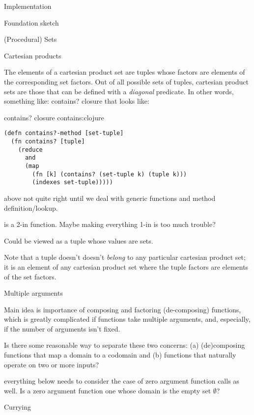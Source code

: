 \documentclass[11pt]{PalisadesLakesBook}
\begin{document}
\begin{plSection}{Implementation}
\begin{plSection}{Foundation sketch}
\begin{plSection}{(Procedural) Sets}
\begin{plSection}{Cartesian products} 

The elements of a cartesian product set are tuples
whose factors are elements of the corresponding set factors.
Out of all possible sets of tuples, cartesian product sets
are those that can be defined with a \emph{diagonal} predicate.
In other words, something like:
{\pseudocodeFont contains?} closure that looks like: 
\begin{plListing}
{{\pseudocodeFont contains?} closure}
{contains:clojure}
\begin{lstlisting}[language=pseudocode]
(defn contains?-method [set-tuple]
  (fn contains? [tuple]
    (reduce 
      and 
      (map 
        (fn [k] (contains? (set-tuple k) (tuple k)))
        (indexes set-tuple)))))
\end{lstlisting}
\end{plListing}
\TODO above not quite right until we deal with generic functions
and method definition/lookup. 

 is a 2-in function.
Maybe making everything 1-in is too much trouble?

Could be viewed as a tuple whose values are sets.

Note that a tuple doesn't doesn't \emph{belong} to any
particular cartesian product set; 
it is an element of any cartesian product set 
where the tuple factors are elements of the set factors.

\end{plSection}%

\end{plSection}%
\begin{plSection}{Multiple arguments}

Main idea is importance of composing and factoring (de-composing)
functions, which is greatly complicated 
if functions take multiple arguments,
and, especially, if the number of arguments isn't fixed. 

Is there some reasonable way to separate these two concerns:
(a) (de)composing functions that map a domain to a codomain
and 
(b) functions that naturally operate on two or more inputs?

\TODO everything below needs to consider the case of zero
argument function calls as well. 
Is a zero argument function one whose domain is the empty set
$\emptyset$?
\begin{plSection}{Currying}


\end{plSection}
\end{plSection}
\end{plSection}
\end{plSection}
\end{document}
